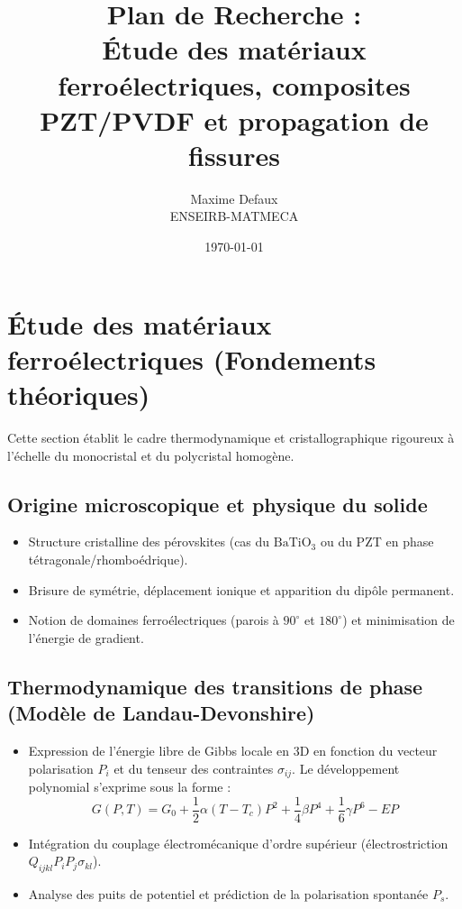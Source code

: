 \documentclass[12pt,a4paper]{article}
\title{\textbf{Plan de Recherche :}\\ Étude des matériaux ferroélectriques, composites PZT/PVDF et propagation de fissures}
\author{Maxime Defaux \\ ENSEIRB-MATMECA}
\date{\today}
\begin{document}
\maketitle

\tableofcontents
\newpage

\section{Étude des matériaux ferroélectriques (Fondements théoriques)}

Cette section établit le cadre thermodynamique et cristallographique rigoureux à l'échelle du monocristal et du polycristal homogène.

\subsection{Origine microscopique et physique du solide}
\begin{itemize}
    \item Structure cristalline des pérovskites (cas du $\text{BaTiO}_3$ ou du PZT en phase tétragonale/rhomboédrique).
    \item Brisure de symétrie, déplacement ionique et apparition du dipôle permanent.
    \item Notion de domaines ferroélectriques (parois à $90^\circ$ et $180^\circ$) et minimisation de l'énergie de gradient.
\end{itemize}

\subsection{Thermodynamique des transitions de phase (Modèle de Landau-Devonshire)}
\begin{itemize}
    \item Expression de l'énergie libre de Gibbs locale en 3D en fonction du vecteur polarisation $P_i$ et du tenseur des contraintes $\sigma_{ij}$. Le développement polynomial s'exprime sous la forme :
    $$G(P, T) = G_0 + \frac{1}{2}\alpha(T - T_c)P^2 + \frac{1}{4}\beta P^4 + \frac{1}{6}\gamma P^6 - EP$$
    \item Intégration du couplage électromécanique d'ordre supérieur (électrostriction $Q_{ijkl}P_iP_j\sigma_{kl}$).
    \item Analyse des puits de potentiel et prédiction de la polarisation spontanée $P_s$.
\end{itemize}
\end{document}
